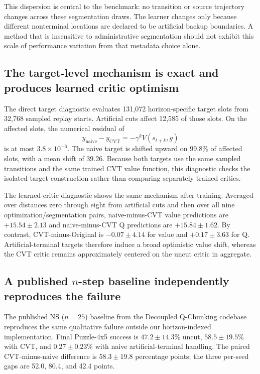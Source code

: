 This dispersion is central to the benchmark: no transition or source trajectory changes across these segmentation draws. The learner changes only because different nonterminal locations are declared to be artificial backup boundaries. A method that is insensitive to administrative segmentation should not exhibit this scale of performance variation from that metadata choice alone.

\subsection{The target-level mechanism is exact and produces learned critic optimism}

The direct target diagnostic evaluates 131,072 horizon-specific target slots from 32,768 sampled replay starts. Artificial cuts affect 12,585 of those slots. On the affected slots, the numerical residual of
\begin{equation}
  y_{\mathrm{naive}}-y_{\mathrm{CVT}}
  =-\gamma^kV(s_{t+k},g)
\end{equation}
is at most $3.8\times10^{-6}$. The naive target is shifted upward on 99.8\% of affected slots, with a mean shift of 39.26. Because both targets use the same sampled transitions and the same trained CVT value function, this diagnostic checks the isolated target construction rather than comparing separately trained critics.

The learned-critic diagnostic shows the same mechanism after training. Averaged over distances zero through eight from artificial cuts and then over all nine optimization/segmentation pairs, naive-minus-CVT value predictions are $+15.54\pm2.13$ and naive-minus-CVT Q predictions are $+15.84\pm1.62$. By contrast, CVT-minus-Original is $-0.07\pm4.14$ for value and $+0.17\pm3.63$ for Q. Artificial-terminal targets therefore induce a broad optimistic value shift, whereas the CVT critic remains approximately centered on the uncut critic in aggregate.

\subsection{A published $n$-step baseline independently reproduces the failure}

The published NS ($n=25$) baseline from the Decoupled Q-Chunking codebase \cite{li2026dqc} reproduces the same qualitative failure outside our horizon-indexed implementation. Final Puzzle-4x5 success is $47.2\pm14.3$\% uncut, $58.5\pm19.5$\% with CVT, and $0.27\pm0.23$\% with naive artificial-terminal handling. The paired CVT-minus-naive difference is $58.3\pm19.8$ percentage points; the three per-seed gaps are 52.0, 80.4, and 42.4 points.

